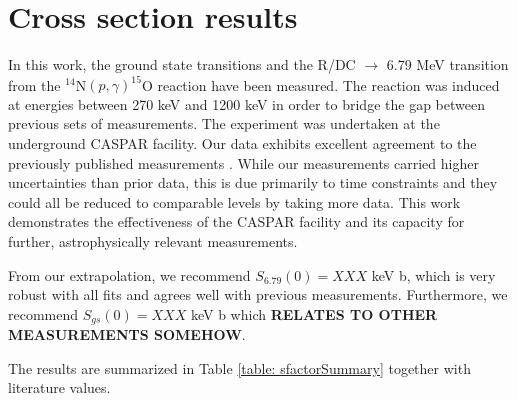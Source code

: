 \section{Cross section results}
\label{sec: csResults}

In this work, the ground state transitions and the R/DC $\rightarrow$ 6.79 MeV transition from the $^{14}$N$(p,\gamma)^{15}$O reaction have been measured. The reaction was induced at energies between 270 keV and 1200 keV in order to bridge the gap between previous sets of measurements. The experiment was undertaken at the underground CASPAR facility. Our data exhibits excellent agreement to the previously published measurements \cite{Schroder1987, Formicola2004, Imbriani2005, Runkle2005, Marta2008, Marta2011, Li2016, Wagner2018}. While our measurements carried higher uncertainties than prior data, this is due primarily to time constraints and they could all be reduced to comparable levels by taking more data. This work demonstrates the effectiveness of the CASPAR facility and its capacity for further, astrophysically relevant measurements. 

From our extrapolation, we recommend $S_{6.79}(0) = XXX$ keV b, which is very robust with all fits and agrees well with previous measurements. Furthermore, we recommend $S_{gs}(0) = XXX$ keV b which \textbf{RELATES TO OTHER MEASUREMENTS SOMEHOW}. 

The results are summarized in Table \ref{table: sfactorSummary} together with literature values.


